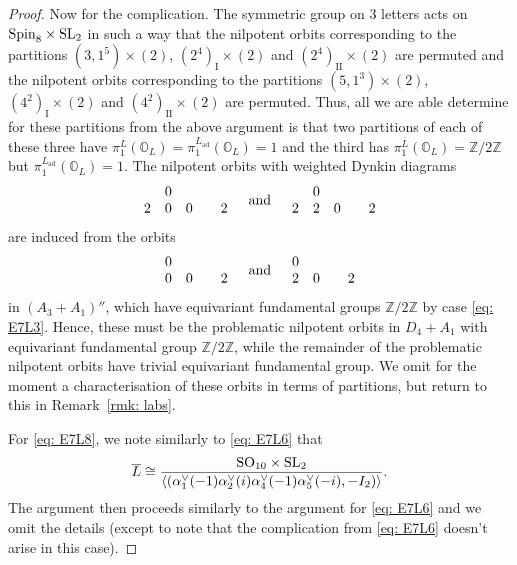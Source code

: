 \documentclass[11pt]{amsart}
\renewcommand{\O}{{\mathbb O}}
\newcommand{\bZ}{{\mathbb Z}}
\newcommand{\I}{{\mathfrak I}}
\newcommand{\ad}{{\operatorname{ad}}}
\newcommand{\II}{{\operatorname{II}}}
\renewcommand{\I}{{\operatorname{I}}}
\newcommand{\Spin}{{\operatorname{Spin}}}
\newcommand{\SL}{{{\mbox{\rm SL}}}}
\newcommand{\SO}{{{\mbox{\rm SO}}}}
\numberwithin{equation}{section}
\begin{document}
\begin{proof}
		Now for the complication. The symmetric group on 3 letters acts on $\Spin_8\times \SL_2$ in such a way that the nilpotent orbits corresponding to the partitions $(3,1^5)\times (2)$, $(2^4)_\I \times (2)$ and $(2^4)_\II\times (2)$ are permuted and the nilpotent orbits corresponding to the partitions $(5,1^3)\times (2)$, $(4^2)_\I\times (2)$ and $(4^2)_\II\times (2)$ are permuted. Thus, all we are able determine for these partitions from the above argument is that two partitions of each of these three have $\pi_1^{\overline{L}}(\O_L)=\pi_1^{L_\ad}(\O_L)=1$ and the third has $\pi_1^{\overline{L}}(\O_L)=\bZ/2\bZ$ but $\pi_1^{L_\ad}(\O_L)=1$. The nilpotent orbits with weighted Dynkin diagrams
		$$\renewcommand{\arraystretch}{}\begin{array}{c c c c c}
			& 0 & & &  \\
			2 & 0 & 0 &  & 2   \\
		\end{array}\quad \mbox{and}\quad  \begin{array}{c c c c c}
			& 0 & & &  \\
			2 & 2 & 0 &  & 2   \\
		\end{array}$$ are induced from the orbits $$\renewcommand{\arraystretch}{}\begin{array}{c c c c}
			0 & & &  \\
			0 & 0 &  & 2   \\
		\end{array}\quad \mbox{and}\quad  \begin{array}{c c c c}
			0 & & &  \\
			2 & 0 &  & 2   \\
		\end{array}$$ in $(A_3+A_1)''$, which have equivariant fundamental groups $\bZ/2\bZ$ by case \eqref{eq: E7L3}. Hence, these must be the problematic nilpotent orbits in $D_4+A_1$ with equivariant fundamental group $\bZ/2\bZ$, while the remainder of the problematic nilpotent orbits have trivial equivariant fundamental group. We omit for the moment a characterisation of these orbits in terms of partitions, but return to this in Remark~\ref{rmk: labs}. 
		
		For \eqref{eq: E7L8}, we note similarly to \eqref{eq: E7L6} that $$\overline{L}\cong\frac{\SO_{10}\times \SL_2}{\langle (\alpha_1^\vee(-1)\alpha_2^\vee(i)\alpha_4^\vee(-1)\alpha_5^\vee(-i),-I_2)\rangle}.$$ The argument then proceeds similarly to the argument for \eqref{eq: E7L6} and we omit the details (except to note that the complication from  \eqref{eq: E7L6} doesn't arise in this case).
		

\end{proof}
\end{document}
